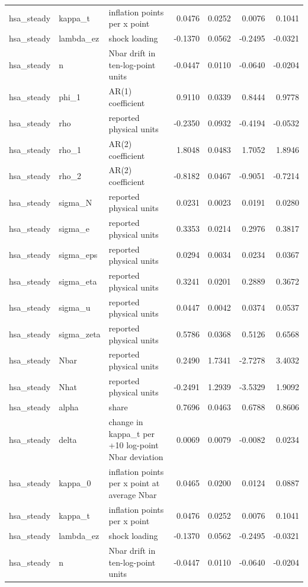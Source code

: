 \begin{tabular}{lllrrrr}
hsa\_steady & kappa\_t & inflation points per x point & 0.0476 & 0.0252 & 0.0076 & 0.1041 \\
hsa\_steady & lambda\_ez & shock loading & -0.1370 & 0.0562 & -0.2495 & -0.0321 \\
hsa\_steady & n & Nbar drift in ten-log-point units & -0.0447 & 0.0110 & -0.0640 & -0.0204 \\
hsa\_steady & phi\_1 & AR(1) coefficient & 0.9110 & 0.0339 & 0.8444 & 0.9778 \\
hsa\_steady & rho & reported physical units & -0.2350 & 0.0932 & -0.4194 & -0.0532 \\
hsa\_steady & rho\_1 & AR(2) coefficient & 1.8048 & 0.0483 & 1.7052 & 1.8946 \\
hsa\_steady & rho\_2 & AR(2) coefficient & -0.8182 & 0.0467 & -0.9051 & -0.7214 \\
hsa\_steady & sigma\_N & reported physical units & 0.0231 & 0.0023 & 0.0191 & 0.0280 \\
hsa\_steady & sigma\_e & reported physical units & 0.3353 & 0.0214 & 0.2976 & 0.3817 \\
hsa\_steady & sigma\_eps & reported physical units & 0.0294 & 0.0034 & 0.0234 & 0.0367 \\
hsa\_steady & sigma\_eta & reported physical units & 0.3241 & 0.0201 & 0.2889 & 0.3672 \\
hsa\_steady & sigma\_u & reported physical units & 0.0447 & 0.0042 & 0.0374 & 0.0537 \\
hsa\_steady & sigma\_zeta & reported physical units & 0.5786 & 0.0368 & 0.5126 & 0.6568 \\
hsa\_steady & Nbar & reported physical units & 0.2490 & 1.7341 & -2.7278 & 3.4032 \\
hsa\_steady & Nhat & reported physical units & -0.2491 & 1.2939 & -3.5329 & 1.9092 \\
hsa\_steady & alpha & share & 0.7696 & 0.0463 & 0.6788 & 0.8606 \\
hsa\_steady & delta & change in kappa\_t per +10 log-point Nbar deviation & 0.0069 & 0.0079 & -0.0082 & 0.0234 \\
hsa\_steady & kappa\_0 & inflation points per x point at average Nbar & 0.0465 & 0.0200 & 0.0124 & 0.0887 \\
hsa\_steady & kappa\_t & inflation points per x point & 0.0476 & 0.0252 & 0.0076 & 0.1041 \\
hsa\_steady & lambda\_ez & shock loading & -0.1370 & 0.0562 & -0.2495 & -0.0321 \\
hsa\_steady & n & Nbar drift in ten-log-point units & -0.0447 & 0.0110 & -0.0640 & -0.0204 \\

\end{tabular}
